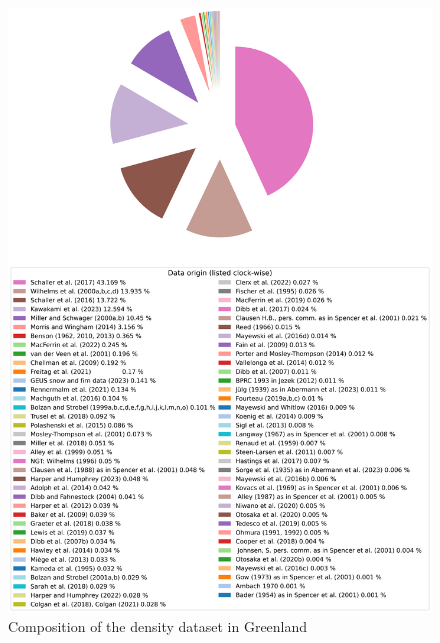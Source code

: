 \documentclass[journal abbreviation, manuscript]{copernicus}
\begin{document}
\begin{figure}[!htb]
\caption{Composition of the density dataset in Greenland}
\centering
\includegraphics[scale=0.4]{figures/density_dataset_composition_greenland.png}
\end{figure}
\end{document}

